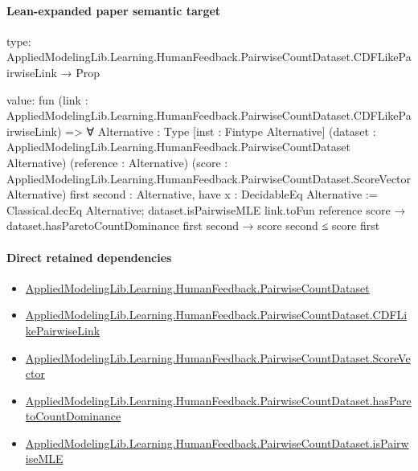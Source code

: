 \documentclass[10pt]{article}
\begin{document}
\paragraph{Lean-expanded paper semantic target}
\begin{ReviewVerbatim}
type:
AppliedModelingLib.Learning.HumanFeedback.PairwiseCountDataset.CDFLikePairwiseLink → Prop

value:
fun (link : AppliedModelingLib.Learning.HumanFeedback.PairwiseCountDataset.CDFLikePairwiseLink) =>
  ∀ {Alternative : Type} [inst : Fintype Alternative]
    (dataset : AppliedModelingLib.Learning.HumanFeedback.PairwiseCountDataset Alternative) (reference : Alternative)
    (score : AppliedModelingLib.Learning.HumanFeedback.PairwiseCountDataset.ScoreVector Alternative)
    {first second : Alternative},
    have x : DecidableEq Alternative := Classical.decEq Alternative;
    dataset.isPairwiseMLE link.toFun reference score →
      dataset.hasParetoCountDominance first second → score second ≤ score first
\end{ReviewVerbatim}

\paragraph{Direct retained dependencies}
\begin{itemize}\raggedright
\item \hyperlink{governing-declaration-2ba23f394a8d08a2}{Applied\allowbreak{}Modeling\allowbreak{}Lib.\allowbreak{}Learning.\allowbreak{}Human\allowbreak{}Feedback.\allowbreak{}Pairwise\allowbreak{}Count\allowbreak{}Dataset}
\item \hyperlink{governing-declaration-3449f3559185d0fd}{Applied\allowbreak{}Modeling\allowbreak{}Lib.\allowbreak{}Learning.\allowbreak{}Human\allowbreak{}Feedback.\allowbreak{}Pairwise\allowbreak{}Count\allowbreak{}Dataset.\allowbreak{}CDF\allowbreak{}Like\allowbreak{}Pairwise\allowbreak{}Link}
\item \hyperlink{governing-declaration-87eda978eb1b0c9d}{Applied\allowbreak{}Modeling\allowbreak{}Lib.\allowbreak{}Learning.\allowbreak{}Human\allowbreak{}Feedback.\allowbreak{}Pairwise\allowbreak{}Count\allowbreak{}Dataset.\allowbreak{}Score\allowbreak{}Vector}
\item \hyperlink{governing-declaration-daebbc3b47540730}{Applied\allowbreak{}Modeling\allowbreak{}Lib.\allowbreak{}Learning.\allowbreak{}Human\allowbreak{}Feedback.\allowbreak{}Pairwise\allowbreak{}Count\allowbreak{}Dataset.\allowbreak{}has\allowbreak{}Pareto\allowbreak{}Count\allowbreak{}Dominance}
\item \hyperlink{governing-declaration-cba21d23e0e5aa10}{Applied\allowbreak{}Modeling\allowbreak{}Lib.\allowbreak{}Learning.\allowbreak{}Human\allowbreak{}Feedback.\allowbreak{}Pairwise\allowbreak{}Count\allowbreak{}Dataset.\allowbreak{}is\allowbreak{}Pairwise\allowbreak{}MLE}
\end{itemize}
\end{document}
